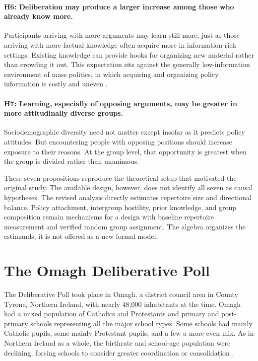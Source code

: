\documentclass[11pt]{article}
\begin{document}
\paragraph{H6: Deliberation may produce a larger increase among those who already know more.}
Participants arriving with more arguments may learn still more, just as those arriving with
more factual knowledge often acquire more in information-rich settings. Existing knowledge can
provide hooks for organizing new material rather than crowding it out. This expectation sits
against the generally low-information environment of mass politics, in which acquiring and
organizing policy information is costly and uneven
\citep{downs1957economic,iyengar1990shortcuts,gilens2001political}.

\paragraph{H7: Learning, especially of opposing arguments, may be greater in more
attitudinally diverse groups.}
Sociodemographic diversity need not matter except insofar as it predicts policy attitudes. But
encountering people with opposing positions should increase exposure to their reasons. At the
group level, that opportunity is greatest when the group is divided rather than unanimous.

These seven propositions reproduce the theoretical setup that motivated the original study.
The available design, however, does not identify all seven as causal hypotheses. The revised
analysis directly estimates repertoire size and directional balance. Policy attachment,
intergroup hostility, prior knowledge, and group composition remain mechanisms for a design
with baseline repertoire measurement and verified random group assignment. The algebra
organizes the estimands; it is not offered as a new formal model.

\section{The Omagh Deliberative Poll}

The Deliberative Poll took place in Omagh, a district council area in County Tyrone, Northern
Ireland, with nearly 48,000 inhabitants at the time. Omagh had a mixed population of Catholics
and Protestants and primary and post-primary schools representing all the major school types.
Some schools had mainly Catholic pupils, some mainly Protestant pupils, and a few a more even
mix. As in Northern Ireland as a whole, the birthrate and school-age population were declining,
forcing schools to consider greater coordination or consolidation \citep{deni2007schools}.
\end{document}
